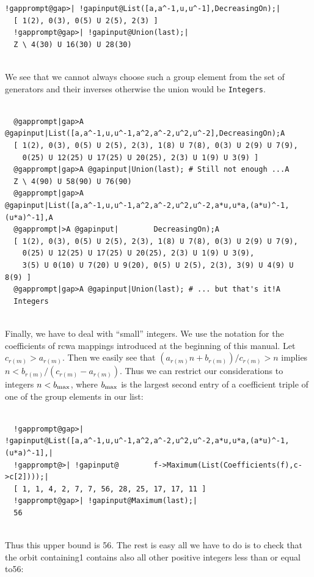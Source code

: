 \documentclass[a4paper,11pt]{report}
\begin{document}
{{\begin{Verbatim}[commandchars=!@|,fontsize=\small,frame=single,label=Example]
  !gapprompt@gap>| !gapinput@List([a,a^-1,u,u^-1],DecreasingOn);|
  [ 1(2), 0(3), 0(5) U 2(5), 2(3) ]
  !gapprompt@gap>| !gapinput@Union(last);|
  Z \ 4(30) U 16(30) U 28(30)
  
\end{Verbatim}
 We see that we cannot always choose such a group element from the set of
generators and their inverses \texttt{}\texttt{}
otherwise the union would be \texttt{Integers}. 
\begin{Verbatim}[commandchars=@|A,fontsize=\small,frame=single,label=Example]
  
  @gapprompt|gap>A @gapinput|List([a,a^-1,u,u^-1,a^2,a^-2,u^2,u^-2],DecreasingOn);A
  [ 1(2), 0(3), 0(5) U 2(5), 2(3), 1(8) U 7(8), 0(3) U 2(9) U 7(9), 
    0(25) U 12(25) U 17(25) U 20(25), 2(3) U 1(9) U 3(9) ]
  @gapprompt|gap>A @gapinput|Union(last); # Still not enough ...A
  Z \ 4(90) U 58(90) U 76(90)
  @gapprompt|gap>A @gapinput|List([a,a^-1,u,u^-1,a^2,a^-2,u^2,u^-2,a*u,u*a,(a*u)^-1,(u*a)^-1],A
  @gapprompt|>A @gapinput|        DecreasingOn);A
  [ 1(2), 0(3), 0(5) U 2(5), 2(3), 1(8) U 7(8), 0(3) U 2(9) U 7(9), 
    0(25) U 12(25) U 17(25) U 20(25), 2(3) U 1(9) U 3(9), 
    3(5) U 0(10) U 7(20) U 9(20), 0(5) U 2(5), 2(3), 3(9) U 4(9) U 8(9) ]
  @gapprompt|gap>A @gapinput|Union(last); # ... but that's it!A
  Integers
  
\end{Verbatim}
 Finally, we have to deal with ``small'' integers. We use the notation for the coefficients of rcwa mappings introduced
at the beginning of this manual. Let $c_{r(m)} > a_{r(m)}$. Then we easily see that $(a_{r(m)}n+b_{r(m)})/c_{r(m)} > n$ implies $n < b_{r(m)}/(c_{r(m)}-a_{r(m)})$. Thus we can restrict our considerations to integers $n < b_{\rm max}$, where $b_{\rm max}$ is the largest second entry of a coefficient triple of one of the group
elements in our list: 
\begin{Verbatim}[commandchars=!@|,fontsize=\small,frame=single,label=Example]
  
  !gapprompt@gap>| !gapinput@List([a,a^-1,u,u^-1,a^2,a^-2,u^2,u^-2,a*u,u*a,(a*u)^-1,(u*a)^-1],|
  !gapprompt@>| !gapinput@        f->Maximum(List(Coefficients(f),c->c[2])));|
  [ 1, 1, 4, 2, 7, 7, 56, 28, 25, 17, 17, 11 ]
  !gapprompt@gap>| !gapinput@Maximum(last);|
  56
  
\end{Verbatim}
 Thus this upper bound is 56. The rest is easy
\texttt{}\texttt{} all we have to do is to check that
the orbit containing{\nobreakspace}1 contains also all other positive integers
less than or equal to{\nobreakspace}56: 
\begin{Verbatim}[commandchars=!@|,fontsize=\small,frame=single,label=Example]
  

\end{Verbatim}}}
\end{document}
